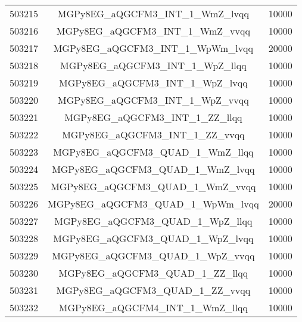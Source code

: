 \begin{table}[!htbp]
\begin{center}
\begin{tabular}{c|c|c}
503215 & MGPy8EG\_aQGCFM3\_INT\_1\_WmZ\_lvqq     & 10000 \\
503216 & MGPy8EG\_aQGCFM3\_INT\_1\_WmZ\_vvqq     & 10000 \\
503217 & MGPy8EG\_aQGCFM3\_INT\_1\_WpWm\_lvqq    & 20000 \\
503218 & MGPy8EG\_aQGCFM3\_INT\_1\_WpZ\_llqq     & 10000 \\
503219 & MGPy8EG\_aQGCFM3\_INT\_1\_WpZ\_lvqq     & 10000 \\
503220 & MGPy8EG\_aQGCFM3\_INT\_1\_WpZ\_vvqq     & 10000 \\
503221 & MGPy8EG\_aQGCFM3\_INT\_1\_ZZ\_llqq      & 10000 \\
503222 & MGPy8EG\_aQGCFM3\_INT\_1\_ZZ\_vvqq      & 10000 \\
503223 & MGPy8EG\_aQGCFM3\_QUAD\_1\_WmZ\_llqq    & 10000 \\
503224 & MGPy8EG\_aQGCFM3\_QUAD\_1\_WmZ\_lvqq    & 10000 \\
503225 & MGPy8EG\_aQGCFM3\_QUAD\_1\_WmZ\_vvqq    & 10000 \\
503226 & MGPy8EG\_aQGCFM3\_QUAD\_1\_WpWm\_lvqq   & 20000 \\
503227 & MGPy8EG\_aQGCFM3\_QUAD\_1\_WpZ\_llqq    & 10000 \\
503228 & MGPy8EG\_aQGCFM3\_QUAD\_1\_WpZ\_lvqq    & 10000 \\
503229 & MGPy8EG\_aQGCFM3\_QUAD\_1\_WpZ\_vvqq    & 10000 \\
503230 & MGPy8EG\_aQGCFM3\_QUAD\_1\_ZZ\_llqq     & 10000 \\
503231 & MGPy8EG\_aQGCFM3\_QUAD\_1\_ZZ\_vvqq     & 10000 \\
503232 & MGPy8EG\_aQGCFM4\_INT\_1\_WmZ\_llqq     & 10000 \\

\hline
\end{tabular}
\label{tabular:mc_samples_aqgc_2}
\end{center}
\end{table}



